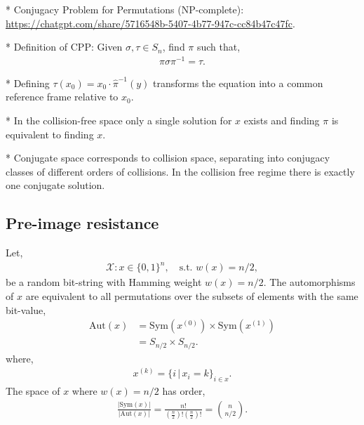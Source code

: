 \documentclass[twocolumn, aps, amsmath, amssymb, nofootinbib, superscriptaddress, longbibliography, doublefloatfix, table-of-contents, eqsecnum, rmp]{revtex4-2}
\def\selfbraid#1#2#3{\langle#1\rangle_{#2}^{#3}}
\def\symbraid#1{\langle#1\rangle_{\pi}^{\pi^{-1}}}
\begin{document}
* Conjugacy Problem for Permutations (NP-complete): \url{https://chatgpt.com/share/5716548b-5407-4b77-947c-cc84b47c47fc}.

* Definition of CPP: Given $\sigma,\tau\in S_n$, find $\pi$ such that,
\begin{align}
	\pi\sigma\pi^{-1} = \tau.	
\end{align}

* Defining $\tau(x_0) = x_0 \cdot \hat\pi^{-1}(y)$ transforms the equation into a common reference frame relative to $x_0$.

* In the collision-free space only a single solution for $x$ exists and finding $\pi$ is equivalent to finding $x$.

* Conjugate space corresponds to collision space, separating into conjugacy classes of different orders of collisions. In the collision free regime there is exactly one conjugate solution.






\subsection{Pre-image resistance}

Let,
\begin{align}
	\mathcal{X}: x\in\{0,1\}^n,\quad \mathrm{s.t.}\,\,w(x)=n/2,
\end{align}
be a random bit-string with Hamming weight \mbox{$w(x)=n/2$}. The automorphisms of $x$ are equivalent to all permutations over the subsets of elements with the same bit-value,
\begin{align}
	\mathrm{Aut}(x) &= \mathrm{Sym}(x^{(0)}) \times \mathrm{Sym}(x^{(1)}) \nonumber\\
	&= S_{n/2}\times S_{n/2}.
\end{align}
where,
\begin{align}
	x^{(k)}=\{i\,|\, x_i=k\}_{i\in x}.
\end{align}
The space of $x$ where $w(x)=n/2$ has order,
\begin{align}
	\frac{|\mathrm{Sym}(x)|}{|\mathrm{Aut}(x)|} = \frac{n!}{(\frac{n}{2})!(\frac{n}{2})!} = \binom{n}{n/2}.
\end{align}
\end{document}
